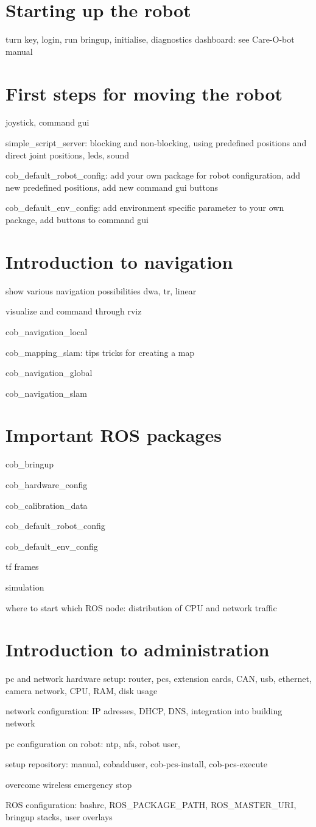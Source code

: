 \documentclass[12pt,twoside]{report}
\begin{document}
\section{Starting up the robot}
turn key, login, run bringup, initialise, diagnostics dashboard: see Care-O-bot manual

\section{First steps for moving the robot}
joystick, command gui

simple\_script\_server: blocking and non-blocking, using predefined positions and direct joint positions, leds, sound

cob\_default\_robot\_config: add your own package for robot configuration, add new predefined positions, add new command gui buttons

cob\_default\_env\_config: add environment specific parameter to your own package, add buttons to command gui

\section{Introduction to navigation}
show various navigation possibilities dwa, tr, linear

visualize and command through rviz

cob\_navigation\_local

cob\_mapping\_slam: tips tricks for creating a map

cob\_navigation\_global

cob\_navigation\_slam

\section{Important ROS packages}
cob\_bringup

cob\_hardware\_config

cob\_calibration\_data

cob\_default\_robot\_config

cob\_default\_env\_config

tf frames

simulation

where to start which ROS node: distribution of CPU and network traffic

\section{Introduction to administration}
pc and network hardware setup: router, pcs, extension cards, CAN, usb, ethernet, camera network, CPU, RAM, disk usage

network configuration: IP adresses, DHCP, DNS, integration into building network

pc configuration on robot: ntp, nfs, robot user, 

setup repository: manual, cobadduser, cob-pcs-install, cob-pcs-execute

overcome wireless emergency stop

ROS configuration: bashrc, ROS\_PACKAGE\_PATH, ROS\_MASTER\_URI, bringup stacks, user overlays
\end{document}
